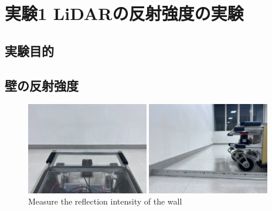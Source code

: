 
\section{実験1 LiDARの反射強度の実験}

\subsection{実験目的}

\newpage

\subsection{壁の反射強度}
  \begin{figure}[h]
    \centering
    \begin{minipage}[c]{65mm} 
        \centering
        \includegraphics[height=40mm]{images/RobotGuidance_exp1_wall_from_back.png}
    \end{minipage}
    \begin{minipage}[c]{65mm} 
        \centering
        \includegraphics[height=40mm]{images/RobotGuidance_exp1_wall_from_side.png}
    \end{minipage}
    \caption{Measure the reflection intensity of the wall}
    \label{Fig:RobotGuidance_exp1_wall}
  \end{figure}

\newpage

